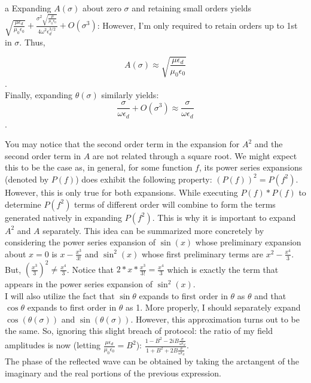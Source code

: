 \begin{homeworkProblem}
\begin{homeworkSection}{a}
Expanding $A(\sigma)$ about zero $\sigma$ and retaining small orders yields $\sqrt{\frac{\mu  \epsilon _d}{\mu _0 \epsilon _0}}+\frac{\sigma ^2 \sqrt{\frac{\mu }{\mu _0 \epsilon _0}}}{4 \omega ^2
   \epsilon _d^{3/2}}+O\left(\sigma ^3\right)$: However, I'm only required to retain orders up to 1st in $\sigma$. Thus, 
	
	\[ A(\sigma) \approx \sqrt{\frac{\mu  \epsilon_{d}}{\mu _0 \epsilon _0}} \].
	\\
		
Finally, expanding $\theta(\sigma)$ similarly yields: \[\frac{\sigma }{\omega \epsilon_{d}}+O\left(\sigma ^3\right)\approx \frac{\sigma}{\omega \epsilon_{d}} \].

	You may notice that the second order term in the expansion for $A^2$ and the second order term in $A$ are not related through a square root. We might expect this to be the case as, in general, for some function $f$, its power series expansions (denoted by $P(f)$) does exhibit the following property: $(P(f))^2 =P(f^2)$. However, this is only true for both expansions. While executing $P(f)*P(f)$ to determine $P(f^2)$ terms of different order will combine to form the terms generated natively in expanding $P(f^2)$. This is why it is important to expand $A^2$ and $A$ separately. This idea can be summarized more concretely by considering the power series expansion of $\sin(x)$ whose preliminary expansion about $x=0$ is $x-\frac{x^3}{3!}$ and $\sin^2(x)$ whose first preliminary terms are $x^2-\frac{x^4}{3}$. But, $(\frac{x^3}{3})^2 \ne \frac{x^4}{3}$. Notice that $2*x*\frac{x^3}{3!} = \frac{x^4}{3}$ which is exactly the term that appears in the power series expansion of $\sin^2(x)$.
	\\

I will also utilize the fact that $\sin\theta$ expands to first order in $\theta$ as $\theta$ and that $\cos\theta$ expands to first order in $\theta$ as 1. More properly, I should separately expand $\cos(\theta(\sigma))$ and $\sin(\theta(\sigma))$. However, this approximation turns out to be the same. So, ignoring this slight breach of protocol: the ratio of my field amplitudes is now (letting $\frac{\mu\epsilon_d}{\mu_0 \epsilon_0} = B^2$): $\frac{1 - B^2 - 2i B \frac{\sigma}{\omega \epsilon_d}}{1 + B^2 + 2 B \frac{\sigma}{\omega \epsilon_d}}$.
\\

The phase of the reflected wave can be obtained by taking the arctangent of the imaginary and the real portions of the previous expression.


\end{homeworkSection}
\end{homeworkProblem}
